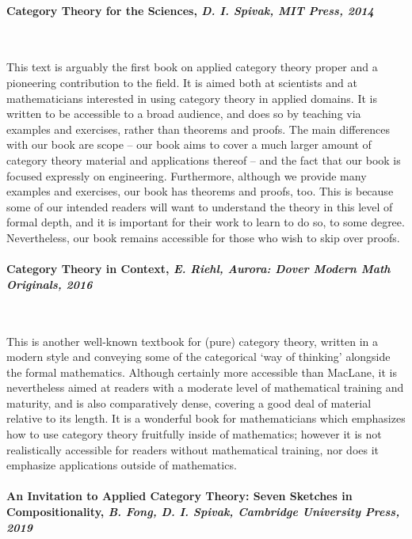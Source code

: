 \documentclass[10pt, article, one side]{memoir}
\begin{document}
    \paragraph{Category Theory for the Sciences, \emph{D.
            I. Spivak, MIT Press, 2014}}
            \
            
            This text is arguably the first book on applied category theory proper and a pioneering contribution to the field. It is aimed both at scientists and at mathematicians interested in using category theory in applied domains. It is written to be accessible to a broad audience, and does so by teaching via examples and exercises, rather than theorems and proofs. The main differences with our book are scope -- our book aims to cover a much larger amount of category theory material and applications thereof -- and the fact that our book is focused expressly on engineering. Furthermore, although we provide many examples and exercises, our book has theorems and proofs, too. This is because some of our intended readers will want to understand the theory in this level of formal depth, and it is important for their work to learn to do so, to some degree. Nevertheless, our book remains accessible for those who wish to skip over proofs.         
            
\paragraph{Category Theory in Context, \emph{E.
            Riehl, Aurora: Dover Modern Math Originals, 2016}}
            \
            
            This is another well-known textbook for (pure) category theory, written in a modern style and conveying some of the categorical `way of thinking' alongside the formal mathematics. Although certainly more accessible than MacLane, it is nevertheless aimed at readers with a moderate level of mathematical training and maturity, and is also comparatively dense, covering a good deal of material relative to its length. It is a wonderful book for mathematicians which emphasizes how to use category theory fruitfully inside of mathematics; however it is not realistically accessible for readers without mathematical training, nor does it emphasize applications outside of mathematics.   

    \paragraph{An Invitation to Applied Category Theory: Seven Sketches in Compositionality, \emph{B.
            Fong, D. I. Spivak, Cambridge University Press, 2019}}
            \
    
\end{document}
